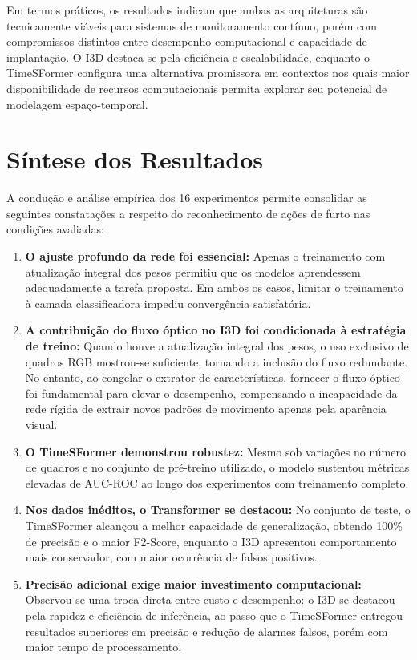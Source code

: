\documentclass[12pt, %
openright, 
oneside, %
a4paper,    %
brazil]{facom-ufu-abntex2}
\begin{document}
Em termos práticos, os resultados indicam que ambas as arquiteturas são tecnicamente viáveis para sistemas de monitoramento contínuo, porém com compromissos distintos entre desempenho computacional e capacidade de implantação. O I3D destaca-se pela eficiência e escalabilidade, enquanto o TimeSFormer configura uma alternativa promissora em contextos nos quais maior disponibilidade de recursos computacionais permita explorar seu potencial de modelagem espaço-temporal.

\section[Síntese dos Resultados]{Síntese dos Resultados}

A condução e análise empírica dos 16 experimentos permite consolidar as seguintes constatações a respeito do reconhecimento de ações de furto nas condições avaliadas:

\begin{enumerate}
    \item \textbf{O ajuste profundo da rede foi essencial:} Apenas o treinamento com atualização integral dos pesos permitiu que os modelos aprendessem adequadamente a tarefa proposta. Em ambos os casos, limitar o treinamento à camada classificadora impediu convergência satisfatória.
    \item \textbf{A contribuição do fluxo óptico no I3D foi condicionada à estratégia de treino:} Quando houve a atualização integral dos pesos, o uso exclusivo de quadros RGB mostrou-se suficiente, tornando a inclusão do fluxo redundante. No entanto, ao congelar o extrator de características, fornecer o fluxo óptico foi fundamental para elevar o desempenho, compensando a incapacidade da rede rígida de extrair novos padrões de movimento apenas pela aparência visual.
    \item \textbf{O TimeSFormer demonstrou robustez:} Mesmo sob variações no número de quadros e no conjunto de pré-treino utilizado, o modelo sustentou métricas elevadas de AUC-ROC ao longo dos experimentos com treinamento completo.
    \item \textbf{Nos dados inéditos, o Transformer se destacou:} No conjunto de teste, o TimeSFormer alcançou a melhor capacidade de generalização, obtendo 100\% de precisão e o maior F2-Score, enquanto o I3D apresentou comportamento mais conservador, com maior ocorrência de falsos positivos.
    \item\textbf{Precisão adicional exige maior investimento computacional:} Observou-se uma troca direta entre custo e desempenho: o I3D se destacou pela rapidez e eficiência de inferência, ao passo que o TimeSFormer entregou resultados superiores em precisão e redução de alarmes falsos, porém com maior tempo de processamento.
\end{enumerate}
\end{document}
